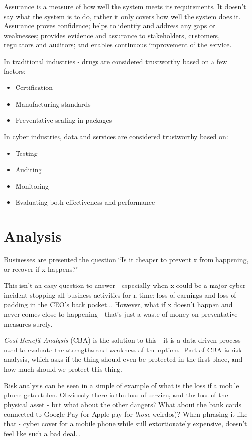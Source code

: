 Assurance is a measure of how well the system meets its requirements. It doesn't say what the system is to do, rather it only covers how well the system does it. Assurance proves confidence; helps to identify and address any gaps or weaknesses; provides evidence and assurance to stakeholders, customers, regulators and auditors; and enables continuous improvement of the service. 

In traditional industries - drugs are considered trustworthy based on a few factors:
\begin{itemize}
    \item Certification
    \item Manufacturing standards
    \item Preventative sealing in packages
\end{itemize}

In cyber industries, data and services are considered trustworthy based on:
\begin{itemize}
    \item Testing
    \item Auditing
    \item Monitoring
    \item Evaluating both effectiveness and performance
\end{itemize}

\section{Analysis}
Businesses are presented the question ``Is it cheaper to prevent x from happening, or recover if x happens?''

This isn't an easy question to answer - especially when x could be a major cyber incident stopping all business activities for n time; loss of earnings and loss of padding in the CEO's back pocket... However, what if x doesn't happen and never comes close to happening - that's just a waste of money on preventative measures surely.

\textit{Cost-Benefit Analysis} (CBA) is the solution to this - it is a data driven process used to evaluate the strengths and weakness of the options. Part of CBA is risk analysis, which asks if the thing should even be protected in the first place, and how much should we protect this thing.

Risk analysis can be seen in a simple of example of what is the loss if a mobile phone gets stolen. Obviously there is the loss of service, and the loss of the physical asset - but what about the other dangers? What about the bank cards connected to Google Pay (or Apple pay for \textit{those} weirdos)? When phrasing it like that - cyber cover for a mobile phone while still extortionately expensive, doesn't feel like such a bad deal...

